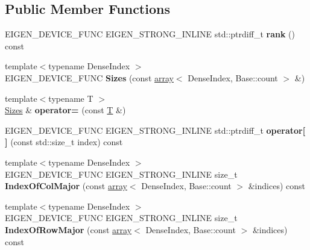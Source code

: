 \subsection*{Public Member Functions}
\begin{DoxyCompactItemize}
\item 
\mbox{\label{struct_eigen_1_1_sizes_ab7bfcdb30ee78574d8f403d52cecdd45}} 
E\+I\+G\+E\+N\+\_\+\+D\+E\+V\+I\+C\+E\+\_\+\+F\+U\+NC E\+I\+G\+E\+N\+\_\+\+S\+T\+R\+O\+N\+G\+\_\+\+I\+N\+L\+I\+NE std\+::ptrdiff\+\_\+t {\bfseries rank} () const
\item 
\mbox{\label{struct_eigen_1_1_sizes_afda455d971c56ffb3913330ac7187dda}} 
{\footnotesize template$<$typename Dense\+Index $>$ }\\E\+I\+G\+E\+N\+\_\+\+D\+E\+V\+I\+C\+E\+\_\+\+F\+U\+NC {\bfseries Sizes} (const \hyperlink{class_eigen_1_1array}{array}$<$ Dense\+Index, Base\+::count $>$ \&)
\item 
\mbox{\label{struct_eigen_1_1_sizes_adf2b582376e79409835b5c3249122a7b}} 
{\footnotesize template$<$typename T $>$ }\\\hyperlink{struct_eigen_1_1_sizes}{Sizes} \& {\bfseries operator=} (const \hyperlink{group___sparse_core___module}{T} \&)
\item 
\mbox{\label{struct_eigen_1_1_sizes_abfbcc60edc2c56c86c0d2eae43f98b25}} 
E\+I\+G\+E\+N\+\_\+\+D\+E\+V\+I\+C\+E\+\_\+\+F\+U\+NC E\+I\+G\+E\+N\+\_\+\+S\+T\+R\+O\+N\+G\+\_\+\+I\+N\+L\+I\+NE std\+::ptrdiff\+\_\+t {\bfseries operator\mbox{[}$\,$\mbox{]}} (const std\+::size\+\_\+t index) const
\item 
\mbox{\label{struct_eigen_1_1_sizes_a12861d5ff0ba87f40598dda26a5b7ce0}} 
{\footnotesize template$<$typename Dense\+Index $>$ }\\E\+I\+G\+E\+N\+\_\+\+D\+E\+V\+I\+C\+E\+\_\+\+F\+U\+NC E\+I\+G\+E\+N\+\_\+\+S\+T\+R\+O\+N\+G\+\_\+\+I\+N\+L\+I\+NE size\+\_\+t {\bfseries Index\+Of\+Col\+Major} (const \hyperlink{class_eigen_1_1array}{array}$<$ Dense\+Index, Base\+::count $>$ \&indices) const
\item 
\mbox{\label{struct_eigen_1_1_sizes_ac4140adc06d53f5cf8f5f171784b3ded}} 
{\footnotesize template$<$typename Dense\+Index $>$ }\\E\+I\+G\+E\+N\+\_\+\+D\+E\+V\+I\+C\+E\+\_\+\+F\+U\+NC E\+I\+G\+E\+N\+\_\+\+S\+T\+R\+O\+N\+G\+\_\+\+I\+N\+L\+I\+NE size\+\_\+t {\bfseries Index\+Of\+Row\+Major} (const \hyperlink{class_eigen_1_1array}{array}$<$ Dense\+Index, Base\+::count $>$ \&indices) const

\end{DoxyCompactItemize}
